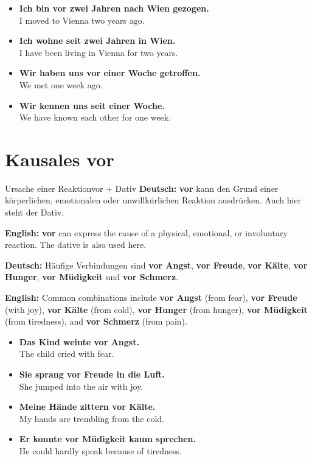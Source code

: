 \documentclass[a4paper,11pt]{article}
\newcommand{\GermanText}[1]{\textbf{Deutsch: }#1\par}
\newcommand{\EnglishText}[1]{{\small\color{SoftGray}\textbf{English: }#1\par}}
\newcommand{\ExampleItem}[2]{\item \textbf{#1}\\{\small\color{SoftGray}#2}}
\begin{document}
        \begin{exbox}
            \begin{itemize}
                \ExampleItem{Ich bin vor zwei Jahren nach Wien gezogen.}{I moved to Vienna two years ago.}
                \ExampleItem{Ich wohne seit zwei Jahren in Wien.}{I have been living in Vienna for two years.}
                \ExampleItem{Wir haben uns vor einer Woche getroffen.}{We met one week ago.}
                \ExampleItem{Wir kennen uns seit einer Woche.}{We have known each other for one week.}
            \end{itemize}
        \end{exbox}


    \section{Kausales \glqq vor\grqq}

        \begin{grammarentry}{Ursache einer Reaktion}{vor + Dativ}
            \GermanText{\textbf{vor} kann den Grund einer körperlichen, emotionalen oder unwillkürlichen Reaktion ausdrücken. Auch hier steht der Dativ.}
            \EnglishText{\textbf{vor} can express the cause of a physical, emotional, or involuntary reaction. The dative is also used here.}

            \GermanText{Häufige Verbindungen sind \textbf{vor Angst}, \textbf{vor Freude}, \textbf{vor Kälte}, \textbf{vor Hunger}, \textbf{vor Müdigkeit} und \textbf{vor Schmerz}.}
            \EnglishText{Common combinations include \textbf{vor Angst} (from fear), \textbf{vor Freude} (with joy), \textbf{vor Kälte} (from cold), \textbf{vor Hunger} (from hunger), \textbf{vor Müdigkeit} (from tiredness), and \textbf{vor Schmerz} (from pain).}
        \end{grammarentry}

        \begin{exbox}
            \begin{itemize}
                \ExampleItem{Das Kind weinte vor Angst.}{The child cried with fear.}
                \ExampleItem{Sie sprang vor Freude in die Luft.}{She jumped into the air with joy.}
                \ExampleItem{Meine Hände zittern vor Kälte.}{My hands are trembling from the cold.}
                \ExampleItem{Er konnte vor Müdigkeit kaum sprechen.}{He could hardly speak because of tiredness.}
            \end{itemize}
        \end{exbox}
\end{document}

